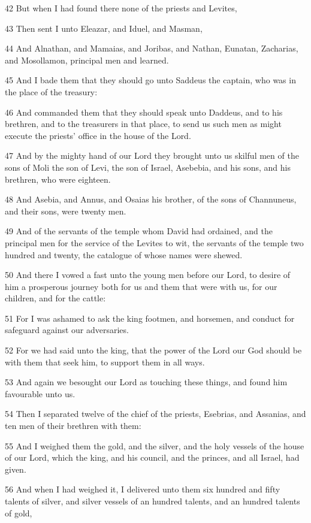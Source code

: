 \par 42 But when I had found there none of the priests and Levites,
\par 43 Then sent I unto Eleazar, and Iduel, and Masman,
\par 44 And Alnathan, and Mamaias, and Joribas, and Nathan, Eunatan, Zacharias, and Mosollamon, principal men and learned.
\par 45 And I bade them that they should go unto Saddeus the captain, who was in the place of the treasury:
\par 46 And commanded them that they should speak unto Daddeus, and to his brethren, and to the treasurers in that place, to send us such men as might execute the priests' office in the house of the Lord.
\par 47 And by the mighty hand of our Lord they brought unto us skilful men of the sons of Moli the son of Levi, the son of Israel, Asebebia, and his sons, and his brethren, who were eighteen.
\par 48 And Asebia, and Annus, and Osaias his brother, of the sons of Channuneus, and their sons, were twenty men.
\par 49 And of the servants of the temple whom David had ordained, and the principal men for the service of the Levites to wit, the servants of the temple two hundred and twenty, the catalogue of whose names were shewed.
\par 50 And there I vowed a fast unto the young men before our Lord, to desire of him a prosperous journey both for us and them that were with us, for our children, and for the cattle:
\par 51 For I was ashamed to ask the king footmen, and horsemen, and conduct for safeguard against our adversaries.
\par 52 For we had said unto the king, that the power of the Lord our God should be with them that seek him, to support them in all ways.
\par 53 And again we besought our Lord as touching these things, and found him favourable unto us.
\par 54 Then I separated twelve of the chief of the priests, Esebrias, and Assanias, and ten men of their brethren with them:
\par 55 And I weighed them the gold, and the silver, and the holy vessels of the house of our Lord, which the king, and his council, and the princes, and all Israel, had given.
\par 56 And when I had weighed it, I delivered unto them six hundred and fifty talents of silver, and silver vessels of an hundred talents, and an hundred talents of gold,
